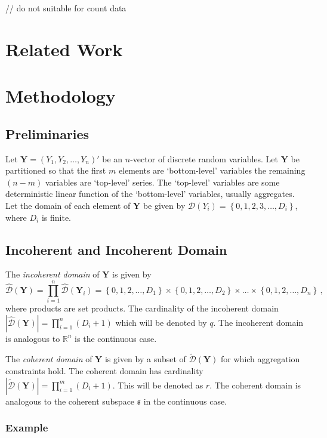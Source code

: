 \documentclass[a4paper,review,12pt,authoryear]{elsarticle}
\newcommand{\bY}{\mathbf{Y}}
\begin{document}
// do not suitable for count data



\section{Related Work}
\section{Methodology}


	\subsection{Preliminaries}
	Let $\bY=\left(Y_1,Y_2,\ldots,Y_n\right)'$ be an $n$-vector of discrete random variables. Let $\bY$ be partitioned so that the first $m$ elements are `bottom-level' variables the remaining $(n-m)$ variables are `top-level' series. The `top-level' variables are some deterministic linear function of the `bottom-level' variables, usually aggregates. Let the domain of each element of $\bY$ be given by $\mathcal{D}(Y_i)=\left\{0, 1,2,3,\dots,D_i\right\}$, where $D_i$ is finite.
	
	\subsection{Incoherent and Incoherent Domain}
	The \textit{incoherent domain} of $\bY$ is given by
	\[
	\hat{\mathcal D}(\bY)=\prod\limits_{i=1}^n\hat{\mathcal D}(\bY_i)=\left\{0, 1,2,\dots,D_1\right\}\times\left\{0,1,2,\dots,D_2\right\}\times\dots\times\left\{0,1,2,\dots,D_n\right\}\,,
	\] 
    where products are set products. The cardinality of the incoherent domain $|\hat{\mathcal D}(\bY)|=\prod\limits_{i=1}^{n} (D_i+1)$ which will be denoted by $q$. The incoherent domain is analogous to $\mathbb{R}^n$ is the continuous case.
    
    The \textit{coherent domain} of $\bY$ is given by a subset of $\tilde{\mathcal D}(\bY)$ for which aggregation constraints hold.  The coherent domain has cardinality $|\tilde{\mathcal D}(\bY)|=\prod\limits_{i=1}^{m} (D_i+1)$. This will be denoted as $r$.  The coherent domain is analogous to the coherent subspace $\mathfrak{s}$ in the continuous case.
    
    \subsubsection*{Example}
    
\end{document}

